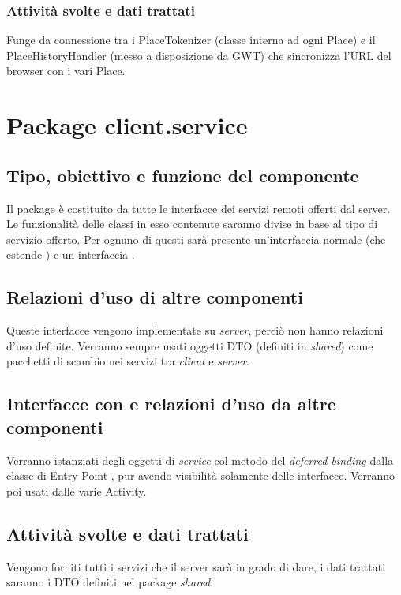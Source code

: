 \subsubsection*{Attivit\`a svolte e dati trattati}
Funge da connessione tra i PlaceTokenizer (classe interna ad ogni Place) e il
PlaceHistoryHandler (messo a disposizione da GWT) che sincronizza l'URL del
browser con i vari Place.

\newpage
\section{Package client.service} %
\subsection*{Tipo, obiettivo e funzione del componente}
Il package  \`e costituito da tutte le interfacce dei servizi remoti
offerti dal server. Le funzionalit\`a delle classi in esso contenute saranno
divise in base al tipo di servizio offerto.  Per ognuno di questi sar\`a
presente un'interfaccia normale (che estende ) e un
interfaccia .

\subsection*{Relazioni d'uso di altre componenti}
Queste interfacce vengono implementate su \emph{server}, perci\`o non
hanno relazioni d'uso definite. Verranno sempre usati oggetti DTO (definiti in
\emph{shared}) come pacchetti di scambio nei servizi tra \emph{client} e
\emph{server}.

\subsection*{Interfacce con e relazioni d'uso da altre componenti}
Verranno istanziati degli oggetti di \emph{service} col metodo del
\emph{deferred binding} dalla classe di Entry Point , pur avendo
visibilit\`a solamente delle interfacce. Verranno poi usati dalle varie Activity.

\subsection*{Attivit\`a svolte e dati trattati}
Vengono forniti tutti i servizi che il server sar\`a in grado di dare, i dati
trattati saranno i DTO definiti nel package \emph{shared}.

